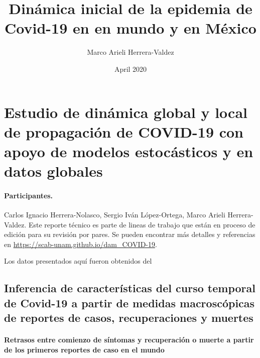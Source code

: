 \documentclass[8pt]{article}
\title{Dinámica inicial de la epidemia de Covid-19 en en mundo y en México }
\author{Marco Arieli Herrera-Valdez}
\date{April 2020}
\begin{document}
%
%
\section*{Estudio de dinámica global y local de propagación de COVID-19 con apoyo de modelos estocásticos y en datos globales}
\paragraph{Participantes.} Carlos Ignacio Herrera-Nolasco, Sergio Iván López-Ortega, Marco Arieli Herrera-Valdez. Este reporte técnico es parte de lineas de trabajo que están en proceso de edición para su revisión por pares. Se pueden encontrar más detalles y referencias en \url{https://scab-unam.github.io/dam_COVID-19}.

Los datos presentados aquí fueron obtenidos del 
\subsection*{Inferencia de características del curso temporal de Covid-19 a partir de medidas macroscópicas de reportes de casos, recuperaciones y muertes}


\paragraph{Retrasos entre comienzo de síntomas y recuperación o muerte a partir de los primeros reportes de caso en el mundo}
\end{document}
